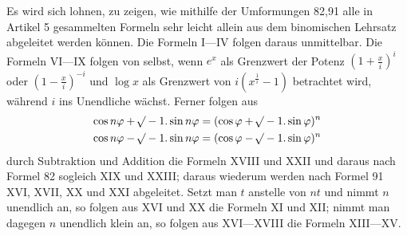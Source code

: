 
Es wird sich lohnen, zu zeigen, wie mithilfe der Umformungen 82,91 alle in Artikel 5 gesammelten Formeln sehr leicht allein aus dem binomischen Lehrsatz abgeleitet werden können. Die Formeln I---IV folgen daraus unmittelbar. Die Formeln VI---IX folgen von selbst, wenn \(e^x\) als Grenzwert der Potenz \(\left(1+\frac{x}{i}\right)^i\) oder \(\left(1-\frac{x}{i}\right)^{-i}\) und \(\log x\) als Grenzwert von \(i(x^{\frac{1}{i}}-1)\) betrachtet wird, während \(i\) ins Unendliche wächst. Ferner folgen aus
\[
\begin{aligned}[c]
\cos n\varphi+\mathord{{}^{}\!\surd}-1.\sin n\varphi&=(\cos\varphi+\mathord{{}^{}\!\surd}-1.\sin\varphi)^n\\
\cos n\varphi-\mathord{{}^{}\!\surd}-1.\sin n\varphi&=(\cos\varphi-\mathord{{}^{}\!\surd}-1.\sin\varphi)^n
\end{aligned}
\]
durch Subtraktion und Addition die Formeln XVIII und XXII und daraus nach Formel 82 sogleich XIX und XXIII; daraus wiederum werden nach Formel 91 XVI, XVII, XX und XXI abgeleitet. Setzt man \(t\) anstelle von \(nt\) und nimmt \(n\) unendlich an, so folgen aus XVI und XX die Formeln XI und XII; nimmt man dagegen \(n\) unendlich klein an, so folgen aus XVI---XVIII die Formeln XIII---XV.


